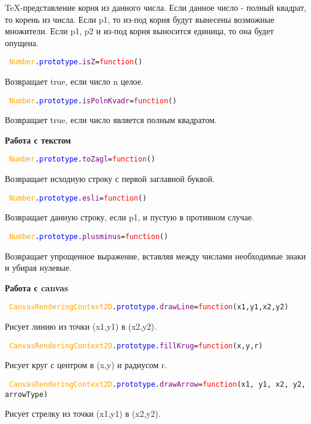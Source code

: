 TeX-представление корня из данного числа.
Если данное число - полный квадрат, то корень из числа.
Если p1, то из-под корня будут вынесены возможные множители.
Если p1, p2 и из-под корня выносится единица, то она будет опущена.

\texttt{
	\textcolor{Orange}{Number}.\textcolor{Blue}{prototype}.\textcolor{Purple}{isZ}=\textcolor{Red}{function}()
}

Возвращает true, если число n целое.

\texttt{
	\textcolor{Orange}{Number}.\textcolor{Blue}{prototype}.\textcolor{Purple}{isPolnKvadr}=\textcolor{Red}{function}()
}

Возвращает true, если число является полным квадратом.

\textbf{Работа с текстом}

\hypertarget{toZagl}{\texttt{
		\textcolor{Orange}{Number}.\textcolor{Blue}{prototype}.\textcolor{Purple}{toZagl}=\textcolor{Red}{function}()
	}}

Возвращает исходную строку с первой заглавной буквой.

\texttt{
	\textcolor{Orange}{Number}.\textcolor{Blue}{prototype}.\textcolor{Purple}{esli}=\textcolor{Red}{function}()
}

Возвращает данную строку, если p1, и пустую в противном случае.

\texttt{
	\textcolor{Orange}{Number}.\textcolor{Blue}{prototype}.\textcolor{Purple}{plusminus}=\textcolor{Red}{function}()
}

Возвращает упрощенное выражение, вставляя между числами необходимые знаки и убирая нулевые.

\textbf{Работа с canvas}

\texttt{
	\textcolor{Orange}{CanvasRenderingContext2D}.\textcolor{Blue}{prototype}.\textcolor{Purple}{drawLine}=\textcolor{Red}{function}(x1,y1,x2,y2)
}

Рисует линию из точки (x1,y1) в (x2,y2).

\texttt{
	\textcolor{Orange}{CanvasRenderingContext2D}.\textcolor{Blue}{prototype}.\textcolor{Purple}{fillKrug}=\textcolor{Red}{function}(x,y,r)
}

Рисует круг с центром в (x,y) и радиусом r.

\texttt{
	\textcolor{Orange}{CanvasRenderingContext2D}.\textcolor{Blue}{prototype}.\textcolor{Purple}{drawArrow}=\textcolor{Red}{function}(x1, y1, x2, y2, arrowType)
}%

Рисует стрелку из точки (x1,y1) в (x2,y2).

